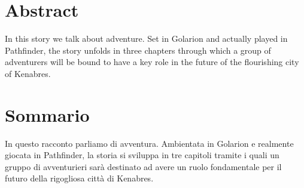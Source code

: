 
\begingroup
\let\clearpage\relax
\let\cleardoublepage\relax
\let\cleardoublepage\relax

\chapter*{Abstract}
In this story we talk about adventure. Set in Golarion and actually played in Pathfinder, the story unfolds in three chapters through which a group of adventurers will be bound to have a key role in the future of the flourishing city of Kenabres.

\vfill

\chapter*{Sommario}
In questo racconto parliamo di avventura. Ambientata in Golarion e realmente giocata in Pathfinder, la storia si sviluppa in tre capitoli tramite i quali un gruppo di avventurieri sar\`a destinato ad avere un ruolo fondamentale per il futuro della rigogliosa citt\`a di Kenabres.

\endgroup			

\vfill

